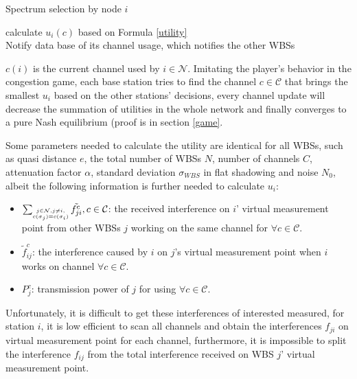\begin{algorithm}[!h]
\caption{Spectrum selection by node $i$}          %
\label{whitecatalgo} 
{
{
 calculate $u_i(c)$ based on Formula \ref{utility}\\
}
Notify data base of its channel usage, which notifies the other WBSs
}
\end{algorithm}

$c(i)$ is the current channel used by $i\in \mathcal{N}$. Imitating the player's behavior in the congestion game, each base station tries to find the channel $c\in \mathcal{C}$ that brings the smallest $u_i$ based on the other stations' decisions, every channel update will decrease the summation of utilities in the whole network and finally converges to a pure Nash equilibrium (proof is in section \ref{game}.


Some parameters needed to calculate the utility are identical for all WBSs, such as quasi distance $e$, the total number of WBSs $N$, number of channels $C$, attenuation factor $\alpha$, standard deviation $\sigma_{WBS}$ in flat shadowing and noise $N_0$, albeit the following information is further needed to calculate $u_i$: 
	\begin{itemize} %
	\item $\sum_{\tiny\substack{j\in \mathcal{N}, j\ne i,\\ c(\sigma_j)=c(\sigma_i)}}\tilde{f_{ji}^c}, c\in \mathcal{C}$: the received interference on $i$' virtual measurement point from other WBSs $j$ working on the same channel for $\forall c\in \mathcal{C}$.
	\item $\tilde f_{ij}^c$: the interference caused by $i$ on $j$'s virtual measurement point when $i$ works on channel $\forall c\in \mathcal{C}$.
	\item $P_j^c$: transmission power of $j$ for using $\forall c\in \mathcal{C}$.
	\end{itemize}
Unfortunately, it is difficult to get these interferences of interested measured, for station $i$, it is low efficient to scan all channels and obtain the interferences $f_{ji}$ on virtual measurement point for each channel, furthermore, it is impossible to split the interference $f_{ij}$ from the total interference received on WBS $j$' virtual measurement point. 

